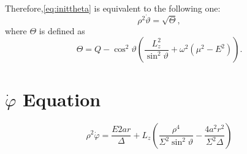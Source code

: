 Therefore,\autoref{eq:inittheta} is equivalent to the following one:
\begin{equation}
	\rho^2 \dot{\vartheta} = \sqrt{\Theta},
\end{equation}
where $\Theta$ is defined as
\begin{equation}
	\label{eq:deftheta}
	\Theta = Q - \cos^2\vartheta \left( \frac{L_z^2}{\sin^2\vartheta} + \omega^2\left(\mu^2 - E^2 \right)\right).
\end{equation}

\section{$\dot{\varphi}$ Equation}
\[
	\rho^2 \dot{\varphi} = \frac{E2ar}{\Delta} + L_z\left( \frac{\rho^4}{\Sigma^2\sin^2\vartheta} - \frac{4a^2r^2}{\Sigma^2\Delta} \right)
\]

